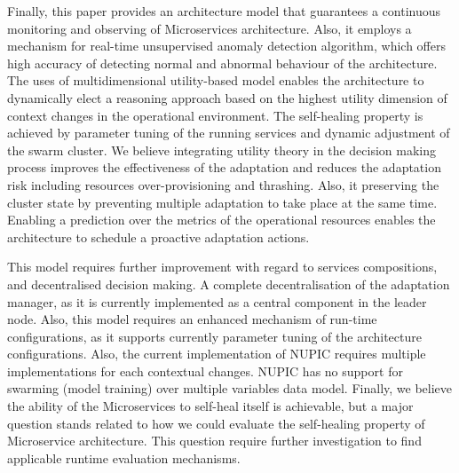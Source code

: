 \documentclass[sigconf]{acmart}
\begin{document}
Finally, this paper provides an architecture model that guarantees a continuous monitoring and observing of Microservices architecture. Also, it employs a mechanism for real-time unsupervised anomaly detection algorithm, which offers high accuracy of detecting normal and abnormal behaviour of the architecture. The uses of multidimensional utility-based model enables the architecture to dynamically elect a reasoning approach based on the highest utility dimension of context changes in the operational environment. The self-healing property is achieved by parameter tuning of the running services and dynamic adjustment of the swarm cluster. We believe integrating utility theory in the decision making process improves the effectiveness of the adaptation and reduces the adaptation risk including resources over-provisioning and thrashing. Also, it preserving the cluster state by preventing multiple adaptation to take place at the same time. Enabling a prediction over the metrics of the operational resources enables the architecture to schedule a proactive adaptation actions. 

This model requires further improvement with regard to services compositions, and decentralised decision making. A complete decentralisation of the adaptation manager, as it is currently implemented as a central component in the leader node. Also, this model requires an enhanced mechanism of run-time configurations, as it supports currently parameter tuning of the architecture configurations. Also, the current implementation of NUPIC requires multiple implementations for each contextual changes. NUPIC has no support for swarming (model training) over multiple variables data model. Finally, we believe the ability of the Microservices to self-heal itself is achievable, but a major question stands related to how we could evaluate the self-healing property of Microservice architecture. This question require further investigation to find applicable runtime evaluation mechanisms.      


 
\end{document}
